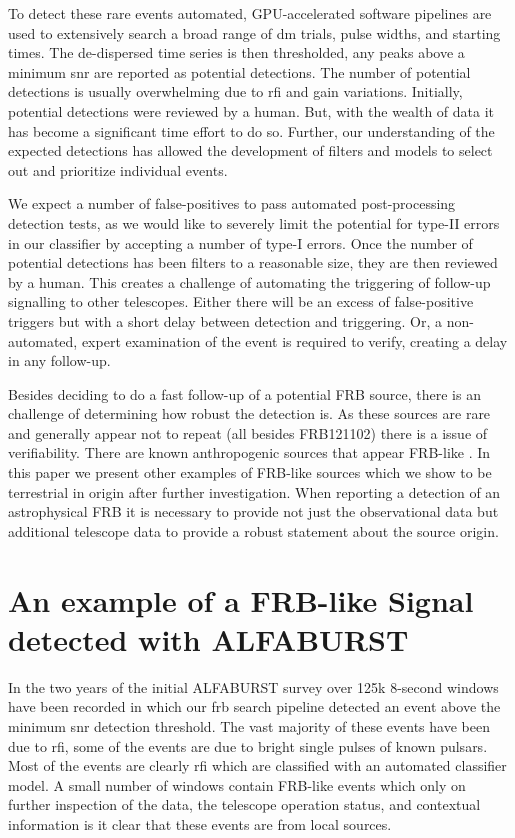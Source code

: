 \documentclass[a4paper,fleqn,usenatbib]{mnras}
\begin{document}
To detect these rare events automated, GPU-accelerated software pipelines are
used to extensively search a broad range of \gls{dm} trials, pulse widths, and
starting times. The de-dispersed time series is then thresholded, any peaks
above a minimum \gls{snr} are reported as potential detections. The number of
potential detections is usually overwhelming due to \gls{rfi} and gain
variations. Initially, potential detections were reviewed by a human. But, with
the wealth of data it has become a significant time effort to do so. Further,
our understanding of the expected detections has allowed the development of
filters and models to select out and prioritize individual events.

We expect a number of false-positives to pass automated post-processing detection
tests, as we would like to severely limit the potential for type-II errors in
our classifier by accepting a number of type-I errors. Once the number of
potential detections has been filters to a reasonable size, they are then
reviewed by a human. This creates a challenge of automating the triggering of
follow-up signalling to other telescopes. Either there will be an excess of
false-positive triggers but with a short delay between detection and triggering.
Or, a non-automated, expert examination of the event is required to verify,
creating a delay in any follow-up.

Besides deciding to do a fast follow-up of a potential FRB source, there is an
challenge of determining how robust the detection is. As these sources are rare
and generally appear not to repeat (all besides FRB121102) there is a issue
of verifiability. There are known anthropogenic sources that appear FRB-like
\citep{2011ApJ...727...18B}. In this paper we present other examples of FRB-like
sources which we show to be terrestrial in origin after further investigation.
When reporting a detection of an astrophysical FRB it is necessary to provide
not just the observational data but additional telescope data to provide a
robust statement about the source origin.

\section{An example of a FRB-like Signal detected with ALFABURST}
\label{sec:D20161204}

In the two years of the initial ALFABURST survey\citep{2017ApJS..228...21C} over
125k 8-second windows have been recorded in which our \gls{frb} search pipeline
detected an event above the minimum \gls{snr} detection threshold. The vast
majority of these events have been due to \gls{rfi}, some of the events are due
to bright single pulses of known pulsars. Most of the events are
clearly \gls{rfi} which are classified with an automated classifier model. A
small number of windows contain FRB-like events which only on further inspection
of the data, the telescope operation status, and contextual information is it
clear that these events are from local sources.
\end{document}

